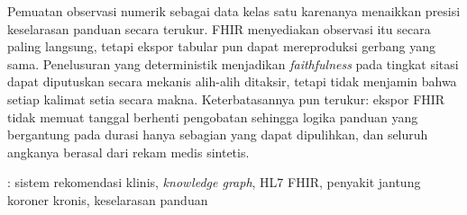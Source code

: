 \begin{singlespace}
Pemuatan observasi numerik sebagai data kelas satu karenanya menaikkan presisi keselarasan
panduan secara terukur. FHIR menyediakan observasi itu secara paling langsung, tetapi ekspor
tabular pun dapat mereproduksi gerbang yang sama. Penelusuran yang deterministik menjadikan
\emph{faithfulness} pada tingkat sitasi dapat diputuskan secara mekanis alih-alih ditaksir,
tetapi tidak menjamin bahwa setiap kalimat setia secara makna. Keterbatasannya pun
terukur: ekspor FHIR tidak memuat tanggal berhenti pengobatan sehingga logika panduan yang
bergantung pada durasi hanya sebagian yang dapat dipulihkan, dan seluruh angkanya berasal dari
rekam medis sintetis.

\vspace{6pt}
 : sistem rekomendasi klinis, \emph{knowledge graph}, HL7 FHIR,
penyakit jantung koroner kronis, keselarasan panduan

\end{singlespace}
